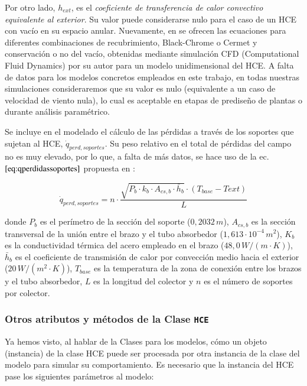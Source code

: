 Por otro lado,  \(h_{ext}\), es el \textit{coeficiente de transferencia de calor convectivo  equivalente al exterior}. Su valor puede considerarse nulo para el caso  de un HCE con vacío en su espacio anular. Nuevamente, en \cite{barberofresnoDesarrolloModeloTeorico2018} se ofrecen las ecuaciones para diferentes combinaciones de   recubrimiento, Black-Chrome o Cermet y conservación o no del vacío,   obtenidas mediante simulación CFD (Computational Fluid Dynamics) por su autor para un modelo unidimensional del HCE. A falta de datos para los modelos concretos empleados en este trabajo, en todas nuestras simulaciones consideraremos que su valor es nulo (equivalente a un caso de velocidad de viento nula), lo cual es aceptable en etapas de prediseño de plantas o durante análisis paramétrico.

Se incluye en el modelado el cálculo de las pérdidas a través de los soportes que sujetan al HCE, \(\dot q_{perd,soportes}\). Su peso relativo en el total de pérdidas del campo no es muy elevado, por lo que, a falta de más datos, se hace uso de la ec.\(\eqref{eq:qperdidassoportes}\)  propuesta en \cite{forristallHeatTransferAnalysis2003}:

\begin{equation}
   \dot q_{perd,soportes} =  n \cdot \frac{\sqrt{P_b \cdot k_b \cdot A_{cs,b} \cdot \bar h_b} \cdot (T_{base} - T{ext})}{L}
    \label{eq:qperdidassoportes}
\end{equation}

donde \(P_b\) es el perímetro de la sección del soporte ($0,2032\,m$), \(A_{cs,b}\) es la sección transversal de la unión entre el brazo y el tubo absorbedor ($1,613\cdot 10^{-4}\,  m^2$), \(K_b\) es la conductividad térmica del acero empleado en el brazo ($48,0\,W/(m \cdot K)$), \(\bar h_b\) es el coeficiente de transmisión de calor por convección medio hacia el exterior ($20\, W/(m^2 \cdot K)$), \(T_{base}\) es la temperatura de la zona de conexión entre los brazos y el tubo absorbedor, \(L\) es la longitud del colector y \(n\) es el número de soportes por colector.

\subsubsection{Otros atributos y métodos de la Clase \texttt{HCE}}

Ya hemos visto, al hablar de la Clases para los modelos, cómo un objeto (instancia) de la clase HCE puede ser procesada por otra instancia de la clase del modelo para simular su comportamiento. Es necesario que la instancia del HCE pase los siguientes parámetros al modelo:

